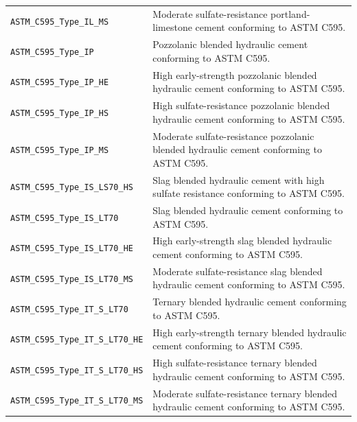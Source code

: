\documentclass[11pt]{book}
\begin{document}
{\begin{longtable}{p{}p{}}
\texttt{ASTM\_C595\_Type\_IL\_MS} &
Moderate sulfate-resistance portland-limestone cement conforming to ASTM C595. \\

\texttt{ASTM\_C595\_Type\_IP} &
Pozzolanic blended hydraulic cement conforming to ASTM C595. \\

\texttt{ASTM\_C595\_Type\_IP\_HE} &
High early-strength pozzolanic blended hydraulic cement conforming to ASTM C595. \\

\texttt{ASTM\_C595\_Type\_IP\_HS} &
High sulfate-resistance pozzolanic blended hydraulic cement conforming to ASTM C595. \\

\texttt{ASTM\_C595\_Type\_IP\_MS} &
Moderate sulfate-resistance pozzolanic blended hydraulic cement conforming to ASTM C595. \\

\texttt{ASTM\_C595\_Type\_IS\_LS70\_HS} &
Slag blended hydraulic cement with high sulfate resistance conforming to ASTM C595. \\

\texttt{ASTM\_C595\_Type\_IS\_LT70} &
Slag blended hydraulic cement conforming to ASTM C595. \\

\texttt{ASTM\_C595\_Type\_IS\_LT70\_HE} &
High early-strength slag blended hydraulic cement conforming to ASTM C595. \\

\texttt{ASTM\_C595\_Type\_IS\_LT70\_MS} &
Moderate sulfate-resistance slag blended hydraulic cement conforming to ASTM C595. \\

\texttt{ASTM\_C595\_Type\_IT\_S\_LT70} &
Ternary blended hydraulic cement conforming to ASTM C595. \\

\texttt{ASTM\_C595\_Type\_IT\_S\_LT70\_HE} &
High early-strength ternary blended hydraulic cement conforming to ASTM C595. \\

\texttt{ASTM\_C595\_Type\_IT\_S\_LT70\_HS} &
High sulfate-resistance ternary blended hydraulic cement conforming to ASTM C595. \\

\texttt{ASTM\_C595\_Type\_IT\_S\_LT70\_MS} &
Moderate sulfate-resistance ternary blended hydraulic cement conforming to ASTM C595. \\


\end{longtable}}
\end{document}
